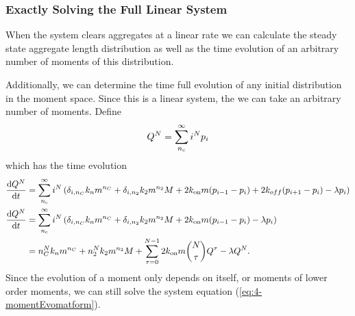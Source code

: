 \subsubsection{Exactly Solving the Full Linear System}

When the system clears aggregates at a linear rate we can calculate the steady state aggregate length distribution as well as the time evolution of an arbitrary number of moments of this distribution.

Additionally, we can determine the time full evolution of any initial distribution in the moment space. Since this is a linear system, the we can take an arbitrary number of moments. Define
\begin{equation}
    Q^{N} = \sum_{n_{\mathrm{c}}}^\infty i^N p_i
\end{equation}
which has the time evolution
\begin{equation}
\begin{split}
    \frac{\text{d}Q^{N}}{\text{d}t} &= \sum_{n_{\mathrm{c}}}^\infty i^N \left( \delta_{i, n_C}k_n m^{n_C} + \delta_{i, n_2} k_2 m^{n_2} M + 2k_\text{on} m (p_{i-1}-p_i) + 2k_{off} (p_{i+1}-p_i) - \lambda p_i \right) \\
    \frac{\text{d}Q^{N}}{\text{d}t} &= \sum_{n_{\mathrm{c}}}^\infty i^N \left( \delta_{i, n_C}k_n m^{n_C} + \delta_{i, n_2} k_2 m^{n_2} M + 2k_\text{on} m (p_{i-1}-p_i) - \lambda p_i \right) \\
    &=n_C^N k_n m^{n_C} + n_2^N k_2 m^{n_2} M + \sum_{\tau=0}^{N-1} 2k_\text{on} m \binom{N}{\tau} Q^{\tau} - \lambda Q^{N}.
\end{split}
\end{equation}
Since the evolution of a moment only depends on itself, or moments of lower order moments, we can still solve the system equation (\ref{eq:4-momentEvomatform}).

